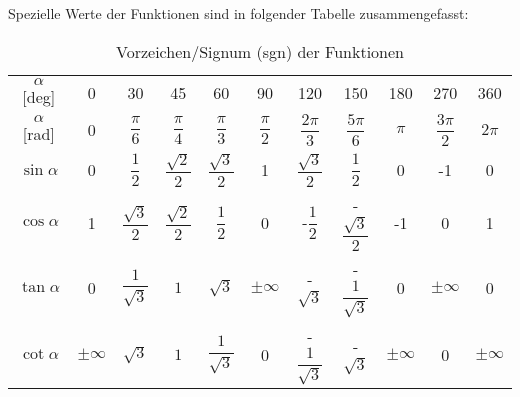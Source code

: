 Spezielle Werte der Funktionen sind in folgender Tabelle zusammengefasst: 
\begin{table}[htp]
    \centering
    \caption{Vorzeichen/Signum (sgn) der Funktionen}
    \begin{tabular}{c c c c c c c c c c c }
        \toprule 
         $\alpha$ [deg] & 0 & 30 & 45 & 60 & 90 & 120 & 150 & 180 & 270 & 360 \\
         $\alpha$ [rad] & 0 & $\dfrac{\pi}{6}$ & $\dfrac{\pi}{4}$ & $\dfrac{\pi}{3}$ & $\dfrac{\pi}{2}$ & $\dfrac{2\pi}{3}$ & $\dfrac{5\pi}{6}$ & $\pi$ & $\dfrac{3\pi}{2}$ & $2\pi$\\[.4em]
         \midrule 
         $\sin\alpha$   & 0 & $\dfrac{1}{2}$ & $\dfrac{\sqrt{2}}{2}$ & $\dfrac{\sqrt{3}}{2}$ & 1 & $\dfrac{\sqrt{3}}{2}$ & $\dfrac{1}{2}$ & 0 & -1 & 0 \\[.7em]
         $\cos\alpha$   & 1 & $\dfrac{\sqrt{3}}{2}$ & $\dfrac{\sqrt{2}}{2}$ & $\dfrac{1}{2}$ & 0 & -$\dfrac{1}{2}$ & -$\dfrac{\sqrt{3}}{2}$ & -1 & 0 & 1 \\[.7em]
         $\tan\alpha$   & 0 & $\dfrac{1}{\sqrt{3}}$ & $1$ & $\sqrt{3}$ & $\pm \infty$ & -$\sqrt{3}$ & -$\dfrac{1}{\sqrt{3}}$ & 0 & $\pm \infty$ & 0 \\[.7em]
         $\cot\alpha$   & $\pm\infty$ & $\sqrt{3}$ & $1$ & $\dfrac{1}{\sqrt{3}}$ & 0 & -$\dfrac{1}{\sqrt{3}}$ & -$\sqrt{3}$ & $\pm \infty$ & 0 & $\pm \infty$ \\

    \end{tabular}
    \vspace{-1cm}
\end{table}